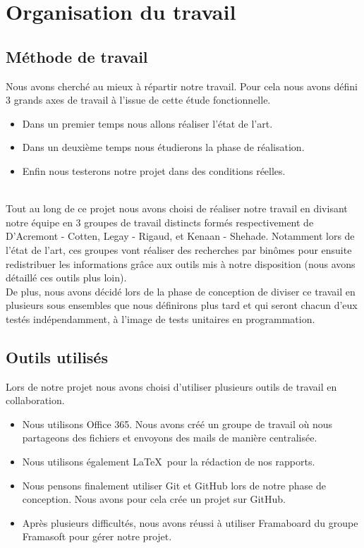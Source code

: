 
\chapter{Organisation du travail}


\section{Méthode de travail}

Nous avons cherché au mieux à répartir notre travail. Pour cela nous avons défini 3 grands axes de travail à l'issue de cette étude fonctionnelle.
\begin{itemize}
\item Dans un premier temps nous allons réaliser l'état de l'art.
\item Dans un deuxième temps nous étudierons la phase de réalisation.
\item Enfin nous testerons notre projet dans des conditions réelles.
\end{itemize}
~\\

Tout au long de ce projet nous avons choisi de réaliser notre travail en divisant notre équipe en 3 groupes de travail distincts formés respectivement de D'Acremont - Cotten, Legay - Rigaud, et Kenaan - Shehade. Notamment lors de l'état de l'art, ces groupes vont réaliser des recherches par binômes pour ensuite redistribuer les informations grâce aux outils mis à notre disposition (nous avons détaillé ces outils plus loin).
~\\

De plus, nous avons décidé lors de la phase de conception de diviser ce travail en plusieurs sous ensembles que nous définirons plus tard et qui seront chacun d'eux testés indépendamment, à l'image de tests unitaires en programmation.



\section{Outils utilisés}

Lors de notre projet nous avons choisi d'utiliser plusieurs outils de travail en collaboration.

\begin{itemize}
\item Nous utilisons Office 365. Nous avons créé un groupe de travail où nous partageons des fichiers et envoyons des mails de manière centralisée.
\item Nous utilisons également \LaTeX~pour la rédaction de nos rapports.
\item Nous pensons finalement utiliser Git et GitHub lors de notre phase de conception. Nous avons pour cela crée un projet sur GitHub.
\item Après plusieurs difficultés, nous avons réussi à utiliser Framaboard du groupe Framasoft pour gérer notre projet.
\end{itemize}

